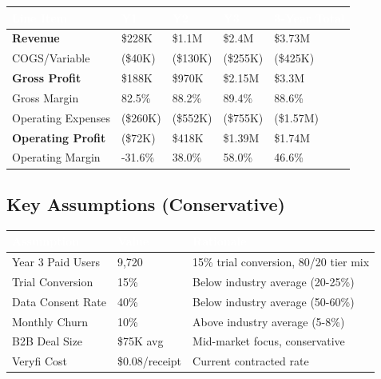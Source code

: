 \documentclass[11pt,a4paper]{article}
\begin{document}
\begin{center}
\begin{tabular}{L{4cm} R{2cm} R{2cm} R{2cm} R{2.5cm}}
    \toprule
    \textcolor{white}{\textbf{Line Item}} & \textcolor{white}{\textbf{Y1}} & \textcolor{white}{\textbf{Y2}} & \textcolor{white}{\textbf{Y3}} & \textcolor{white}{\textbf{3-Year Total}}\\
    \midrule
    \textbf{Revenue} & \$228K & \$1.1M & \$2.4M & \$3.73M\\
    COGS/Variable & (\$40K) & (\$130K) & (\$255K) & (\$425K)\\
    \textbf{Gross Profit} & \$188K & \$970K & \$2.15M & \$3.3M\\
    Gross Margin & 82.5\% & 88.2\% & 89.4\% & 88.6\%\\
    Operating Expenses & (\$260K) & (\$552K) & (\$755K) & (\$1.57M)\\
    \textbf{Operating Profit} & (\$72K) & \$418K & \$1.39M & \$1.74M\\
    Operating Margin & -31.6\% & 38.0\% & 58.0\% & 46.6\%\\
    \bottomrule
\end{tabular}
\end{center}

\subsection{Key Assumptions (Conservative)}

\begin{center}
\begin{tabular}{L{4cm} L{3cm} L{5.5cm}}
    \toprule
    \textcolor{white}{\textbf{Assumption}} & \textcolor{white}{\textbf{Value}} & \textcolor{white}{\textbf{Rationale}}\\
    \midrule
    Year 3 Paid Users & 9,720 & 15\% trial conversion, 80/20 tier mix\\
    Trial Conversion & 15\% & Below industry average (20-25\%)\\
    Data Consent Rate & 40\% & Below industry average (50-60\%)\\
    Monthly Churn & 10\% & Above industry average (5-8\%)\\
    B2B Deal Size & \$75K avg & Mid-market focus, conservative\\
    Veryfi Cost & \$0.08/receipt & Current contracted rate\\
    \bottomrule
\end{tabular}
\end{center}
\end{document}
